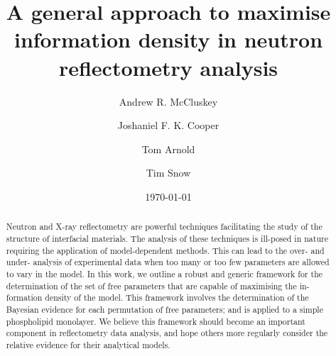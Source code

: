 \documentclass[
 reprint,
 superscriptaddress,
 amsmath,amssymb,
 aps,
]{revtex4-2}
\begin{document}

\title{A general approach to maximise information density in neutron reflectometry analysis}

\author{Andrew R. McCluskey}

\author{Joshaniel F. K. Cooper}
 
\author{Tom Arnold}

\author{Tim Snow}

\date{\today}

\begin{abstract}
Neutron and X-ray reflectometry are powerful techniques facilitating the study of the structure of interfacial materials.
The analysis of these techniques is ill-posed in nature requiring the application of model-dependent methods.
This can lead to the over- and under- analysis of experimental data when too many or too few parameters are allowed to vary in the model. 
In this work, we outline a robust and generic framework for the determination of the set of free parameters that are capable of maximising the in-formation density of the model. 
This framework involves the determination of the Bayesian evidence for each permutation of free parameters; and is applied to a simple phospholipid monolayer. 
We believe this framework should become an important component in reflectometry data analysis, and hope others more regularly consider the relative evidence for their analytical models.
\end{abstract}
\end{document}
